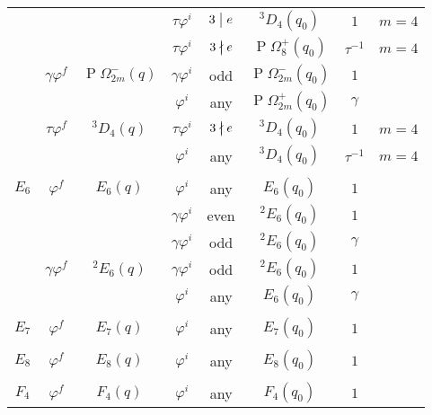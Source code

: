 \documentclass[11pt]{article}
\makeatletter
\numberwithin{equation}{section}
\theoremstyle{shdefinition}
\theoremstyle{shplain}
\newcommand{\g}{\gamma}
\newcommand{\p}{\varphi}
\renewcommand{\t}{\tau}
\newcommand{\<}{\langle}
\renewcommand{\>}{\rangle}
\renewcommand{\:}{\colon}
\def\localbig#1#2{%
  \sbox\z@{$\m@th#1
    \sbox\tw@{$#1()$}%
    \dimen@=\ht\tw@\advance\dimen@\dp\tw@
    \nulldelimiterspace\z@\left#2\vcenter to1.2\dimen@{}\right.
  $}\box\z@}
\renewcommand{\div}{\mathrel{\mathpalette\divaux\relax}}
\newcommand{\ndiv}{\mathrel{\mathpalette\ndividesaux\relax}}
\newcommand{\divaux}[2]{\mbox{$\m@th#1\localbig{#1}|$}}
\newcommand{\ndividesaux}[2]{%
  \mkern.5mu
  \ooalign{%
    \hidewidth$\m@th#1\localbig{#1}|$\hidewidth\cr
    $\m@th#1\nmid$\cr%
  }%
}
\newcommand{\Om}{\Omega}
\newcommand{\POm}{\operatorname{P}\!\Om}
\makeatother
\begin{document}
\begin{table}
\begin{tabular}{cccccccc}
             &          &                  & $\t\p^i$ & $3 \div e$ & ${}^3D_4(q_0)$    & $1$       & $m=4$                    \\
             &          &                  & $\t\p^i$ & $3\ndiv e$ & $\POm^+_8(q_0)$   & $\t^{-1}$ & $m=4$                    \\[5.5pt]
             & $\g\p^f$ & $\POm^-_{2m}(q)$ & $\g\p^i$ & odd        & $\POm^-_{2m}(q_0)$& $1$       &                          \\
             &          &                  & $\p^i$   & any        & $\POm^+_{2m}(q_0)$& $\g$      &                          \\[5.5pt]
             & $\t\p^f$ & ${}^3D_4(q)$     & $\t\p^i$ & $3\ndiv e$ & ${}^3D_4(q_0)$    & $1$       & $m=4$                    \\
             &          &                  & $\p^i$   & any        & ${}^3D_4(q_0)$    & $\t^{-1}$ & $m=4$                    \\[5.5pt]
\hline\\[-9pt]
$E_6$        & $\p^f$   & $E_6(q)$         & $\p^i$   & any        & $E_6(q_0)$        & $1$       &                          \\
             &          &                  & $\g\p^i$ & even       & ${}^2E_6(q_0)$    & $1$       &                          \\
             &          &                  & $\g\p^i$ & odd        & ${}^2E_6(q_0)$    & $\g$      &                          \\[5.5pt]
             & $\g\p^f$ & ${}^2E_6(q)$     & $\g\p^i$ & odd        & ${}^2E_6(q_0)$    & $1$       &                          \\
             &          &                  & $\p^i$   & any        & $E_6(q_0)$        & $\g$      &                          \\[5.5pt]
\hline\\[-9pt]
$E_7$        & $\p^f$   & $E_7(q)$         & $\p^i$   & any        & $E_7(q_0)$        & $1$       &                          \\[5.5pt]
\hline\\[-9pt]
$E_8$        & $\p^f$   & $E_8(q)$         & $\p^i$   & any        & $E_8(q_0)$        & $1$       &                          \\[5.5pt]
\hline\\[-9pt]
$F_4$        & $\p^f$   & $F_4(q)$         & $\p^i$   & any        & $F_4(q_0)$        & $1$       &                          \\

\end{tabular}
\end{table}
\end{document}
